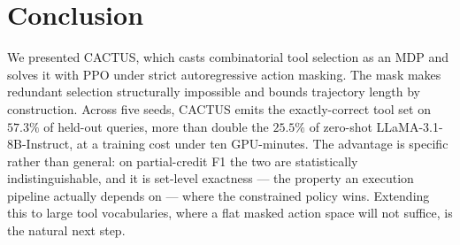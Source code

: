\documentclass[11pt]{article}
\begin{document}
\section{Conclusion}
We presented CACTUS, which casts combinatorial tool selection as an MDP and solves it with PPO under strict autoregressive action masking. The mask makes redundant selection structurally impossible and bounds trajectory length by construction. Across five seeds, CACTUS emits the exactly-correct tool set on $57.3\%$ of held-out queries, more than double the $25.5\%$ of zero-shot LLaMA-3.1-8B-Instruct, at a training cost under ten GPU-minutes. The advantage is specific rather than general: on partial-credit F1 the two are statistically indistinguishable, and it is set-level exactness --- the property an execution pipeline actually depends on --- where the constrained policy wins. Extending this to large tool vocabularies, where a flat masked action space will not suffice, is the natural next step.



\end{document}
